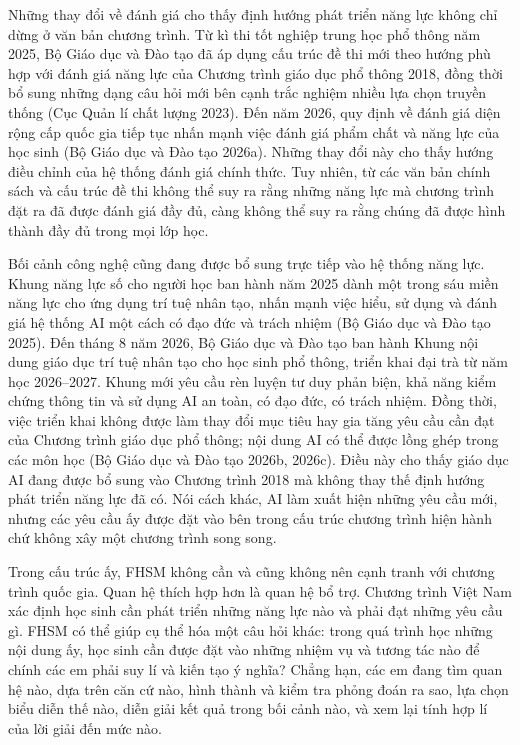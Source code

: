 Những thay đổi về đánh giá cho thấy định hướng phát triển năng lực không chỉ dừng ở văn bản chương trình. Từ kì thi tốt nghiệp trung học phổ thông năm 2025, Bộ Giáo dục và Đào tạo đã áp dụng cấu trúc đề thi mới theo hướng phù hợp với đánh giá năng lực của Chương trình giáo dục phổ thông 2018, đồng thời bổ sung những dạng câu hỏi mới bên cạnh trắc nghiệm nhiều lựa chọn truyền thống (Cục Quản lí chất lượng 2023). Đến năm 2026, quy định về đánh giá diện rộng cấp quốc gia tiếp tục nhấn mạnh việc đánh giá phẩm chất và năng lực của học sinh (Bộ Giáo dục và Đào tạo 2026a). Những thay đổi này cho thấy hướng điều chỉnh của hệ thống đánh giá chính thức. Tuy nhiên, từ các văn bản chính sách và cấu trúc đề thi không thể suy ra rằng những năng lực mà chương trình đặt ra đã được đánh giá đầy đủ, càng không thể suy ra rằng chúng đã được hình thành đầy đủ trong mọi lớp học.

Bối cảnh công nghệ cũng đang được bổ sung trực tiếp vào hệ thống năng lực. Khung năng lực số cho người học ban hành năm 2025 dành một trong sáu miền năng lực cho ứng dụng trí tuệ nhân tạo, nhấn mạnh việc hiểu, sử dụng và đánh giá hệ thống AI một cách có đạo đức và trách nhiệm (Bộ Giáo dục và Đào tạo 2025). Đến tháng 8 năm 2026, Bộ Giáo dục và Đào tạo ban hành Khung nội dung giáo dục trí tuệ nhân tạo cho học sinh phổ thông, triển khai đại trà từ năm học 2026--2027. Khung mới yêu cầu rèn luyện tư duy phản biện, khả năng kiểm chứng thông tin và sử dụng AI an toàn, có đạo đức, có trách nhiệm. Đồng thời, việc triển khai không được làm thay đổi mục tiêu hay gia tăng yêu cầu cần đạt của Chương trình giáo dục phổ thông; nội dung AI có thể được lồng ghép trong các môn học (Bộ Giáo dục và Đào tạo 2026b, 2026c). Điều này cho thấy giáo dục AI đang được bổ sung vào Chương trình 2018 mà không thay thế định hướng phát triển năng lực đã có. Nói cách khác, AI làm xuất hiện những yêu cầu mới, nhưng các yêu cầu ấy được đặt vào bên trong cấu trúc chương trình hiện hành chứ không xây một chương trình song song.

Trong cấu trúc ấy, FHSM không cần và cũng không nên cạnh tranh với chương trình quốc gia. Quan hệ thích hợp hơn là quan hệ bổ trợ. Chương trình Việt Nam xác định học sinh cần phát triển những năng lực nào và phải đạt những yêu cầu gì. FHSM có thể giúp cụ thể hóa một câu hỏi khác: trong quá trình học những nội dung ấy, học sinh cần được đặt vào những nhiệm vụ và tương tác nào để chính các em phải suy lí và kiến tạo ý nghĩa? Chẳng hạn, các em đang tìm quan hệ nào, dựa trên căn cứ nào, hình thành và kiểm tra phỏng đoán ra sao, lựa chọn biểu diễn thế nào, diễn giải kết quả trong bối cảnh nào, và xem lại tính hợp lí của lời giải đến mức nào.

